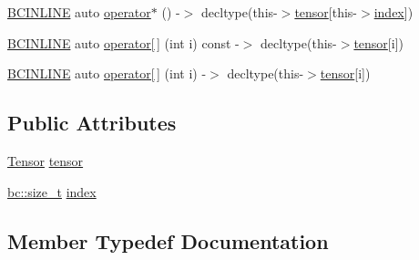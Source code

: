 \begin{DoxyCompactItemize}
\item 
\hyperlink{common_8h_a6699e8b0449da5c0fafb878e59c1d4b1}{B\+C\+I\+N\+L\+I\+NE} auto \hyperlink{structbc_1_1tensors_1_1iterators_1_1Coefficientwise__Iterator_a38e2d0a36ab0f30cc7e827dbc9977b31}{operator$\ast$} () -\/$>$ decltype(this-\/$>$\hyperlink{structbc_1_1tensors_1_1iterators_1_1Coefficientwise__Iterator_a57cc6a9c7df0597c90d03309e367cbd2}{tensor}\mbox{[}this-\/$>$\hyperlink{structbc_1_1tensors_1_1iterators_1_1Coefficientwise__Iterator_a746b74f8681813da3829e96e0e9b8273}{index}\mbox{]})
\item 
\hyperlink{common_8h_a6699e8b0449da5c0fafb878e59c1d4b1}{B\+C\+I\+N\+L\+I\+NE} auto \hyperlink{structbc_1_1tensors_1_1iterators_1_1Coefficientwise__Iterator_a1d1ebbe672ef4fd995d70f5530537dab}{operator\mbox{[}$\,$\mbox{]}} (int i) const -\/$>$ decltype(this-\/$>$\hyperlink{structbc_1_1tensors_1_1iterators_1_1Coefficientwise__Iterator_a57cc6a9c7df0597c90d03309e367cbd2}{tensor}\mbox{[}i\mbox{]})
\item 
\hyperlink{common_8h_a6699e8b0449da5c0fafb878e59c1d4b1}{B\+C\+I\+N\+L\+I\+NE} auto \hyperlink{structbc_1_1tensors_1_1iterators_1_1Coefficientwise__Iterator_aa83865144da81c74772107784b20a307}{operator\mbox{[}$\,$\mbox{]}} (int i) -\/$>$ decltype(this-\/$>$\hyperlink{structbc_1_1tensors_1_1iterators_1_1Coefficientwise__Iterator_a57cc6a9c7df0597c90d03309e367cbd2}{tensor}\mbox{[}i\mbox{]})
\end{DoxyCompactItemize}
\subsection*{Public Attributes}
\begin{DoxyCompactItemize}
\item 
\hyperlink{namespacebc_a659391e47ab612be3ba6c18cf9c89159}{Tensor} \hyperlink{structbc_1_1tensors_1_1iterators_1_1Coefficientwise__Iterator_a57cc6a9c7df0597c90d03309e367cbd2}{tensor}
\item 
\hyperlink{namespacebc_aaf8e3fbf99b04b1b57c4f80c6f55d3c5}{bc\+::size\+\_\+t} \hyperlink{structbc_1_1tensors_1_1iterators_1_1Coefficientwise__Iterator_a746b74f8681813da3829e96e0e9b8273}{index}
\end{DoxyCompactItemize}


\subsection{Member Typedef Documentation}
\mbox{\label{structbc_1_1tensors_1_1iterators_1_1Coefficientwise__Iterator_ae14251c51e153d27da01687742e1e7b0}} 
